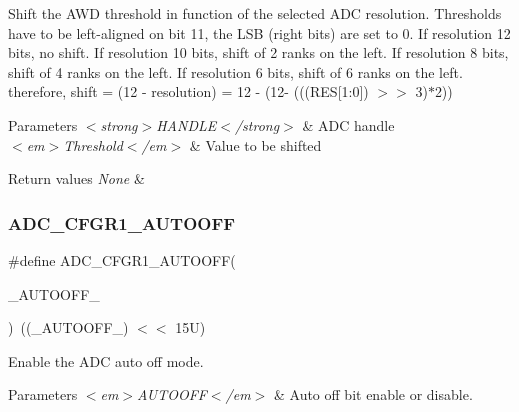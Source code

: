 Shift the A\+WD threshold in function of the selected A\+DC resolution. Thresholds have to be left-\/aligned on bit 11, the L\+SB (right bits) are set to 0. If resolution 12 bits, no shift. If resolution 10 bits, shift of 2 ranks on the left. If resolution 8 bits, shift of 4 ranks on the left. If resolution 6 bits, shift of 6 ranks on the left. therefore, shift = (12 -\/ resolution) = 12 -\/ (12-\/ (((R\+ES\mbox{[}1\+:0\mbox{]}) $>$$>$ 3)$\ast$2)) 


\begin{DoxyParams}{Parameters}
{\em $<$strong$>$\+H\+A\+N\+D\+L\+E$<$/strong$>$} & A\+DC handle \\
\hline
{\em $<$em$>$\+Threshold$<$/em$>$} & Value to be shifted \\
\hline
\end{DoxyParams}

\begin{DoxyRetVals}{Return values}
{\em None} & \\
\hline
\end{DoxyRetVals}
\mbox{\label{group___a_d_c___private___macros_ga36993a7b32f5ec4f4163856f7ba8e8f0}} 
\subsubsection{\texorpdfstring{A\+D\+C\+\_\+\+C\+F\+G\+R1\+\_\+\+A\+U\+T\+O\+O\+FF}{ADC\_CFGR1\_AUTOOFF}}
{\footnotesize\ttfamily \#define A\+D\+C\+\_\+\+C\+F\+G\+R1\+\_\+\+A\+U\+T\+O\+O\+FF(\begin{DoxyParamCaption}\item[{}]{\+\_\+\+A\+U\+T\+O\+O\+F\+F\+\_\+ }\end{DoxyParamCaption})~((\+\_\+\+A\+U\+T\+O\+O\+F\+F\+\_\+) $<$$<$ 15\+U)}



Enable the A\+DC auto off mode. 


\begin{DoxyParams}{Parameters}
{\em $<$em$>$\+A\+U\+T\+O\+O\+F\+F$<$/em$>$} & Auto off bit enable or disable. \\
\hline
\end{DoxyParams}

